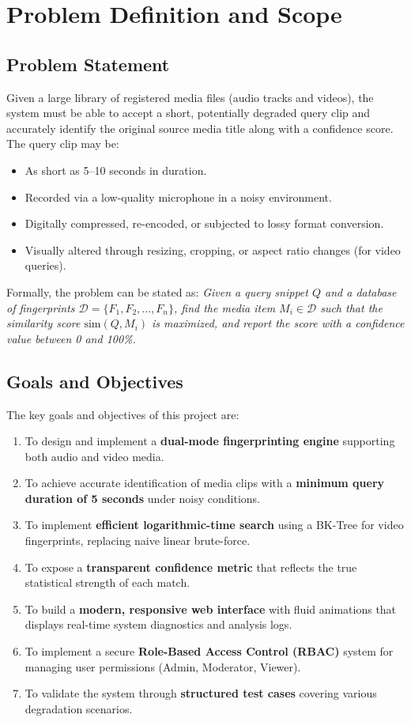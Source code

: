\newpage
\chapter{Problem Definition and Scope}

\section{Problem Statement}
Given a large library of registered media files (audio tracks and videos), the system must be able to accept a short, potentially degraded query clip and accurately identify the original source media title along with a confidence score. The query clip may be:
\begin{itemize}
  \item As short as 5--10 seconds in duration.
  \item Recorded via a low-quality microphone in a noisy environment.
  \item Digitally compressed, re-encoded, or subjected to lossy format conversion.
  \item Visually altered through resizing, cropping, or aspect ratio changes (for video queries).
\end{itemize}

Formally, the problem can be stated as: \textit{Given a query snippet $Q$ and a database of fingerprints $\mathcal{D} = \{F_1, F_2, \ldots, F_n\}$, find the media item $M_i \in \mathcal{D}$ such that the similarity score $\text{sim}(Q, M_i)$ is maximized, and report the score with a confidence value between 0 and 100\%.}

\section{Goals and Objectives}
The key goals and objectives of this project are:
\begin{enumerate}
  \item To design and implement a \textbf{dual-mode fingerprinting engine} supporting both audio and video media.
  \item To achieve accurate identification of media clips with a \textbf{minimum query duration of 5 seconds} under noisy conditions.
  \item To implement \textbf{efficient logarithmic-time search} using a BK-Tree for video fingerprints, replacing naive linear brute-force.
  \item To expose a \textbf{transparent confidence metric} that reflects the true statistical strength of each match.
  \item To build a \textbf{modern, responsive web interface} with fluid animations that displays real-time system diagnostics and analysis logs.
  \item To implement a secure \textbf{Role-Based Access Control (RBAC)} system for managing user permissions (Admin, Moderator, Viewer).
  \item To validate the system through \textbf{structured test cases} covering various degradation scenarios.
\end{enumerate}

